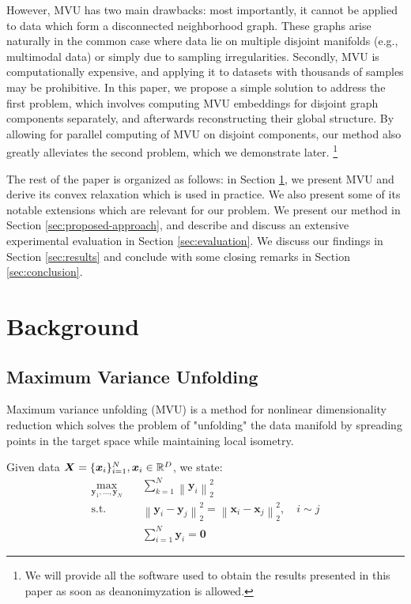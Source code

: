 \documentclass{article} %
\newcommand{\norm}[1]{\left\lVert#1\right\rVert}
\begin{document}
However, MVU has two main drawbacks: most importantly, it cannot be applied to data which form a disconnected neighborhood graph. These graphs arise naturally in the common case where data lie on multiple disjoint manifolds (e.g., multimodal data) or simply due to sampling irregularities. Secondly, MVU is computationally expensive, and applying it to datasets with thousands of samples may be prohibitive. In this paper, we propose a simple solution to address the first problem, which involves computing MVU embeddings for disjoint graph components separately, and afterwards reconstructing their global structure. By allowing for parallel computing of MVU on disjoint components, our method also greatly alleviates the second problem, which we demonstrate later. \footnote{We will provide all the software used to obtain the results presented in this paper as soon as deanonimyzation is allowed.}

The rest of the paper is organized as follows: in Section \ref{sec:background}, we present MVU and derive its convex relaxation which is used in practice. We also present some of its notable extensions which are relevant for our problem. We present our method in Section \ref{sec:proposed-approach}, and describe and discuss an extensive experimental evaluation in Section \ref{sec:evaluation}. We discuss our findings in Section \ref{sec:results} and conclude with some closing remarks in Section \ref{sec:conclusion}.

\section{Background}\label{sec:background}
    
\subsection{Maximum Variance Unfolding}\label{sec:mvu}

Maximum variance unfolding (MVU) \citep{mvu} is a method for nonlinear dimensionality reduction which solves the problem of "unfolding" the data manifold by spreading points in the target space while maintaining local isometry.

Given data $\bm{X}=\{\bm{x}_i\}_{i=1}^N, \bm{x}_i\in\mathbb{R}^D$, we state:
\begin{align}
\max_{\bm{y}_{1},\dotsc,\bm{y}_{N}} \quad & \sum_{k=1}^{N}\norm{\bm{y}_{i}}_{2}^{2}\\
\textrm{s.t.} \quad & \norm{\bm{y}_{i}-\bm{y}_{j}}_{2}^{2}=\norm{\bm{x}_{i}-\bm{x}_{j}}_{2}^{2},\quad i\sim j\label{eq:mvu-isometry-orig}\\
\quad & \sum_{i=1}^{N}\bm{y}_{i}=\bm{0}\label{eq:mvu-zerocenter}
\end{align}
\end{document}
